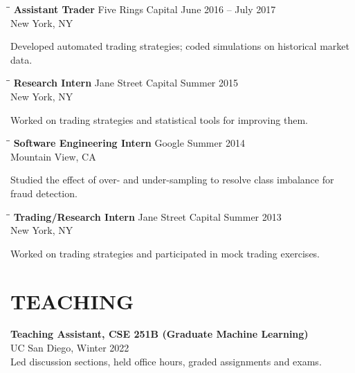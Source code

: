 \documentclass{res}
\begin{document}
\begin{resume}
\begin{tabbing}
\hspace{2.3in}\= \hspace{2.6in}\= \kill
{\bf Assistant Trader} \>Five Rings Capital    \>June 2016 – July 2017\\
\>New York, NY
\end{tabbing}\vspace{-20pt}
Developed automated trading strategies; coded simulations on historical market data.  
\vspace{-0.1in}

\begin{tabbing}
\hspace{2.3in}\= \hspace{2.6in}\= \kill
{\bf Research Intern} \>Jane Street Capital    \>Summer 2015\\
\>New York, NY
\end{tabbing}\vspace{-20pt}
Worked on trading strategies and statistical tools for improving them.  
\vspace{-0.1in}

\begin{tabbing}
\hspace{2.3in}\= \hspace{2.6in}\= \kill
{\bf Software Engineering Intern} \>Google    \>Summer 2014\\
\>Mountain View, CA
\end{tabbing}\vspace{-20pt}
Studied the effect of over- and under-sampling to resolve class imbalance for fraud detection.  
\vspace{-0.1in}

\begin{tabbing}
\hspace{2.3in}\= \hspace{2.6in}\= \kill
{\bf Trading/Research Intern} \>Jane Street Capital    \>Summer 2013\\
\>New York, NY
\end{tabbing}\vspace{-20pt}
Worked on trading strategies and participated in mock trading exercises.  
\vspace{-0.1in}

\section{TEACHING}

\textbf{Teaching Assistant, CSE 251B (Graduate Machine Learning)} \\
UC San Diego, Winter 2022 \\
Led discussion sections, held office hours, graded assignments and exams.


\end{resume}
\end{document}
